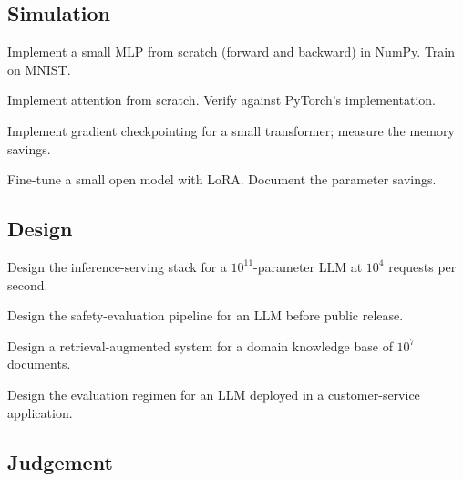 \subsection*{Simulation}

\begin{exercise}
Implement a small MLP from scratch (forward and backward) in NumPy. Train on MNIST.
\end{exercise}

\begin{exercise}
Implement attention from scratch. Verify against PyTorch's implementation.
\end{exercise}

\begin{exercise}
Implement gradient checkpointing for a small transformer; measure the memory savings.
\end{exercise}

\begin{exercise}
Fine-tune a small open model with LoRA. Document the parameter savings.
\end{exercise}

\subsection*{Design}

\begin{exercise}
Design the inference-serving stack for a $10^{11}$-parameter LLM at $10^4$ requests per second.
\end{exercise}

\begin{exercise}
Design the safety-evaluation pipeline for an LLM before public release.
\end{exercise}

\begin{exercise}
Design a retrieval-augmented system for a domain knowledge base of $10^7$ documents.
\end{exercise}

\begin{exercise}
Design the evaluation regimen for an LLM deployed in a customer-service application.
\end{exercise}

\subsection*{Judgement}

